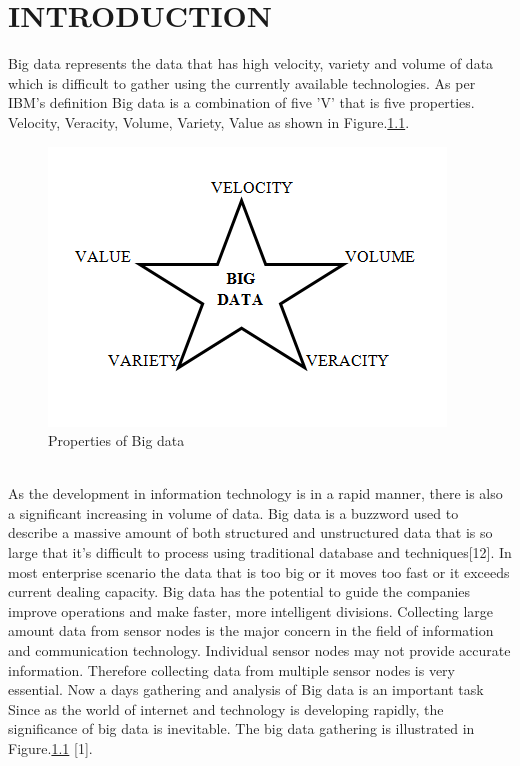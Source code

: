 \documentclass[MTech]{iitmdiss}
\begin{document}
\chapter{INTRODUCTION}
\label{chap:intro}
Big data represents the data that has high velocity, variety and volume of data which is difficult to gather using the currently available technologies. As per IBM's definition Big data is a combination of five 'V'  that is five properties. Velocity, Veracity, Volume, Variety, Value as shown in Figure.\ref{f1}. 
\\
\begin{figure}[ht!]
\centering
\includegraphics{bigdata.PNG}
\caption{Properties of Big data\label{overflow}}
\label{f1}
\end{figure}\\
As the development in  information technology  is in a rapid manner, there is  also a significant increasing  in volume of data. Big data is a buzzword used to describe a massive amount of both  structured and unstructured data that is so large that it's difficult to process using traditional database  and techniques[12]. In most enterprise scenario the data that is too  big or it moves too fast or it exceeds current dealing  capacity. Big data has the potential to guide the companies  improve operations and make faster, more intelligent  divisions. Collecting large amount data from sensor nodes  is the major concern in the field of information and  communication technology. Individual sensor nodes may  not provide accurate information. Therefore collecting  data from multiple sensor nodes is very essential. Now a days  gathering and analysis of Big data is an important  task Since as  the world of internet and technology is developing rapidly, the significance of big data is inevitable. The big data gathering is illustrated in Figure.\ref{f1} [1].
\\
\end{document}
